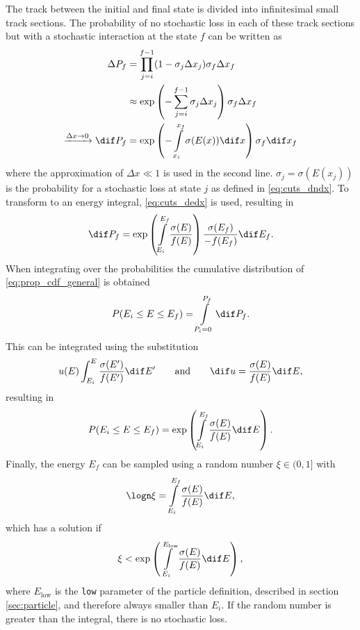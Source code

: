 The track between the initial and final state is divided into infinitesimal small track sections.
The probability of no stochastic loss in each of these track sections but with a stochastic interaction at the state $f$ can be written as
\begin{align}
    \Delta P_f &= \prod\limits_{j=i}^{f-1} (1 - \sigma_j \Delta x_j) \sigma_f \Delta x_f \\
        &\approx \exp \left( - \sum\limits_{j=i}^{f-1} \sigma_j \Delta x_j \right) \sigma_f \Delta x_f \\
    \xrightarrow{\Delta x \to 0} \dif P_f &= \exp \left( - \int\limits_{x_i}^{x_f} \sigma(E(x)) \dif x \right) \sigma_f \dif x_f \label{eq:prop_interaction_integral}
\end{align}
where the approximation of $\Delta x \ll 1$ is used in the second line.
$\sigma_j = \sigma(E(x_j))$ is the probability for a stochastic loss at state $j$ as defined in \eqref{eq:cuts_dndx}.
To transform to an energy integral, \eqref{eq:cuts_dedx} is used, resulting in
\begin{align}
    \dif P_f = \exp \left( \int\limits_{E_i}^{E_f} \frac{\sigma(E)}{f(E)} \right) \frac{\sigma(E_f)}{-f(E_f)} \dif E_f .
\end{align}
When integrating over the probabilities the cumulative distribution of \eqref{eq:prop_cdf_general} is obtained
\begin{align}
    P(E_i \leq E \leq E_f) = \int\limits_{P_i=0}^{P_f} \dif P_f .
\end{align}
This can be integrated using the substitution
\begin{align}
    u(E) \int_{E_i}^E \frac{\sigma(E')}{f(E')} \dif E'
    \qquad \text{and} \qquad
    \dif u = \frac{\sigma(E)}{f(E)} \dif E ,
\end{align}
resulting in
\begin{align}
    P(E_i \leq E \leq E_f) = \exp \left( \int\limits_{E_i}^{E_f} \frac{\sigma(E)}{f(E)} \dif E \right) .
\end{align}
Finally, the energy $E_f$ can be sampled using a random number $\xi \in (0,1]$ with
\begin{align} \label{eq:energy_integral_int}
    \logn \xi = \int\limits_{E_i}^{E_f} \frac{\sigma(E)}{f(E)} \dif E ,
\end{align}
which has a solution if
\begin{align}
    \xi < \exp \left( \int\limits_{E_i}^{E_{\text{low}}} \frac{\sigma(E)}{f(E)} \dif E \right) ,
\end{align}
where $E_{\text{low}}$ is the \texttt{low} parameter of the particle definition, described in section \ref{sec:particle}, and therefore always smaller than $E_i$.
If the random number is greater than the integral, there is no stochastic loss.

